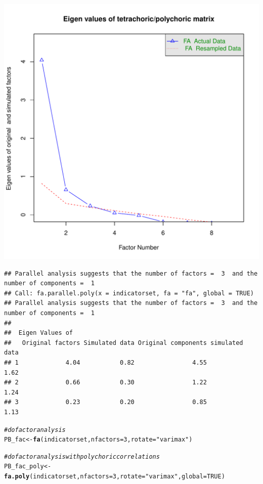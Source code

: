 \documentclass{article}\usepackage[]{graphicx}\usepackage[]{color}
\makeatletter
\def\maxwidth{ %
  \ifdim\Gin@nat@width>\linewidth
    \linewidth
  \else
    \Gin@nat@width
  \fi
}
\newcommand{\hlnum}[1]{\textcolor[rgb]{0.686,0.059,0.569}{#1}}%
\newcommand{\hlstr}[1]{\textcolor[rgb]{0.192,0.494,0.8}{#1}}%
\newcommand{\hlcom}[1]{\textcolor[rgb]{0.678,0.584,0.686}{\textit{#1}}}%
\newcommand{\hlstd}[1]{\textcolor[rgb]{0.345,0.345,0.345}{#1}}%
\newcommand{\hlkwb}[1]{\textcolor[rgb]{0.69,0.353,0.396}{#1}}%
\newcommand{\hlkwc}[1]{\textcolor[rgb]{0.333,0.667,0.333}{#1}}%
\newcommand{\hlkwd}[1]{\textcolor[rgb]{0.737,0.353,0.396}{\textbf{#1}}}%
\newenvironment{kframe}{%
 \def\at@end@of@kframe{}%
 \ifinner\ifhmode%
  \def\at@end@of@kframe{\end{minipage}}%
  \begin{minipage}{\columnwidth}%
 \fi\fi%
 \def\FrameCommand##1{\hskip\@totalleftmargin \hskip-\fboxsep
 \colorbox{shadecolor}{##1}\hskip-\fboxsep
     \hskip-\linewidth \hskip-\@totalleftmargin \hskip\columnwidth}%
 \MakeFramed {\advance\hsize-\width
   \@totalleftmargin\z@ \linewidth\hsize
   \@setminipage}}%
 {\par\unskip\endMakeFramed%
 \at@end@of@kframe}
\newenvironment{knitrout}{}{} %
\makeatother
\begin{document}
\begin{knitrout}
\includegraphics[width=\maxwidth]{figure/psych2} 
\begin{kframe}\begin{verbatim}
## Parallel analysis suggests that the number of factors =  3  and the number of components =  1
## Call: fa.parallel.poly(x = indicatorset, fa = "fa", global = TRUE)
## Parallel analysis suggests that the number of factors =  3  and the number of components =  1 
## 
##  Eigen Values of 
##   Original factors Simulated data Original components simulated data
## 1             4.04           0.82                4.55           1.62
## 2             0.66           0.30                1.22           1.24
## 3             0.23           0.20                0.85           1.13
\end{verbatim}
\begin{alltt}
\hlcom{#do factor analysis}
\hlstd{PB_fac} \hlkwb{<-} \hlkwd{fa}\hlstd{(indicatorset,} \hlkwc{nfactors}\hlstd{=}\hlnum{3}\hlstd{,} \hlkwc{rotate}\hlstd{=}\hlstr{"varimax"}\hlstd{)}

\hlcom{#do factor analysis with polychoric correlations}
\hlstd{PB_fac_poly} \hlkwb{<-} \hlkwd{fa.poly}\hlstd{(indicatorset,} \hlkwc{nfactors}\hlstd{=}\hlnum{3}\hlstd{,} \hlkwc{rotate}\hlstd{=}\hlstr{"varimax"}\hlstd{,}\hlkwc{global}\hlstd{=}\hlnum{TRUE}\hlstd{)}


\end{alltt}
\end{kframe}
\end{knitrout}
\end{document}
